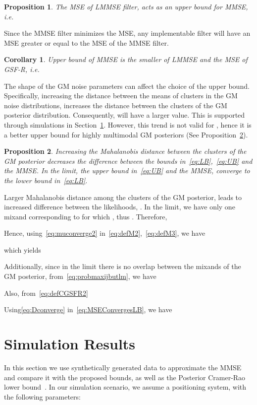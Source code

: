 \documentclass[10pt,twocolumn,twoside]{IEEEtran}
\newtheorem{corol}{Corollary}
\newtheorem{Prop}{Proposition}
\newcommand{\corcol}[1]{\textcolor{CorCol}{#1}}
\begin{document}
\begin{Prop}
\label{prop:KalUL}
The MSE of LMMSE filter, acts as an upper bound for MMSE, i.e.

\end{Prop}
\begin{IEEEproof}
Since the MMSE filter minimizes the MSE, any implementable filter will have an MSE greater or equal to the MSE of the MMSE filter.
\end{IEEEproof}
\begin{corol}
Upper bound of MMSE is the smaller of LMMSE and the MSE of GSF-R, i.e.

\end{corol}
The shape of the GM noise parameters can affect the choice of the upper bound. Specifically, increasing the distance between the means of clusters in the GM noise distributions, increases the distance between the clusters of the GM posterior distribution. Consequently,  will have a larger value. This is supported through simulations in Section~\ref{sec:SimulationResults}. However, this trend is not valid for , hence it is a better upper bound for highly multimodal GM posteriors (See Proposition~\ref{prop:ConvergenceofBounds}).
\begin{Prop}
\label{prop:ConvergenceofBounds}
Increasing the Mahalanobis distance between the clusters of the GM posterior decreases the difference between the bounds in~\eqref{eq:LB},~\eqref{eq:UB} and the MMSE. In the limit, the upper bound in~\eqref{eq:UB} and the MMSE, converge to the lower bound in~\eqref{eq:LB}.
\end{Prop}
\begin{IEEEproof}
Larger Mahalanobis distance among the clusters of the GM posterior, leads to increased difference between the likelihoods,
.
In the limit, we have only one mixand corresponding to  for which , thus . Therefore, 

Hence, using~\eqref{eq:muconverge2} in~\eqref{eq:defM2},~\eqref{eq:defM3}, we have

which yields

Additionally, since in the limit there is no overlap between the mixands of the GM posterior, from~\eqref{eq:probmaxijbutlm}, we have

Also, from\corcol{~\eqref{eq:defCGSFR2}}

\corcol{Using\eqref{eq:Dconverge} in~\eqref{eq:MSEConvergesLB}, we have}

\end{IEEEproof}
 
\section{Simulation Results}
\label{sec:SimulationResults}
In this section we use synthetically generated data to approximate the MMSE and compare it with the proposed bounds\corcol{, as well as the Posterior Cramer-Rao lower bound~\cite{tichavsky_posterior_1998}}. In our simulation scenario, we assume a positioning system, with the following parameters:
\end{document}
